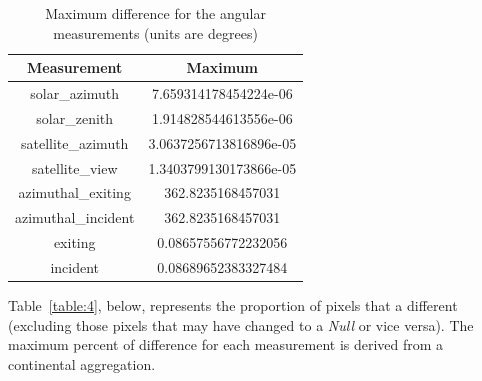 \documentclass[a4paper]{article}
\begin{document}
    \begin{table}[ht!]
      \caption{Maximum difference for the angular measurements (units are degrees)}\label{table:3}
      \centering
      \begin{tabular}{cc} \midrule
        \textbf{Measurement} & \textbf{Maximum} \\ \midrule
        solar\_azimuth & 7.659314178454224e-06 \\
        solar\_zenith & 1.914828544613556e-06 \\
        satellite\_azimuth & 3.0637256713816896e-05 \\
        satellite\_view & 1.3403799130173866e-05 \\
        azimuthal\_exiting & 362.8235168457031 \\
        azimuthal\_incident & 362.8235168457031 \\
        exiting & 0.08657556772232056 \\
        incident & 0.08689652383327484 \\ \midrule
      \end{tabular}
    \end{table}

  \clearpage

    \begin{flushleft}
      Table~\ref{table:4}, below, represents the proportion of pixels that a different (excluding those pixels that may have changed to a \textit{Null} or vice versa). The maximum percent of difference for each measurement is derived from a continental aggregation.
    \end{flushleft}
\end{document}
